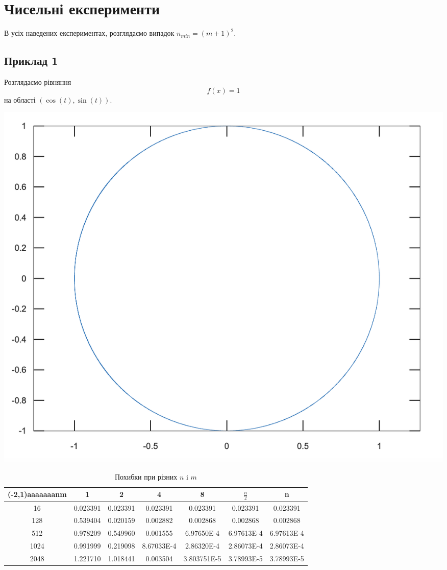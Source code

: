 \documentclass[12pt]{report}
\begin{document}
	\section{Чисельні експерименти}
	\hspace{0.8cm}В усіх наведених експериментах, розглядаємо випадок $n_{min}=(m+1)^2$.
	\subsection{Приклад 1}
	\hspace{0.8cm}Розглядаємо рівняння
	$$f(x)=1$$ 
	на області $(\cos(t), \sin(t))$.
	\begin{center}
	\includegraphics[scale=0.5]{2_3}
	\end{center}
	\begin{table}[ht]
		\centering 
		\begin{tabular}{c c c c c c c } %
			\hline\hline %
			
			\diaghead(-2,1){aaaaaaa}{n}{m} & 1 & 2 & 4 &8 & $\frac{n}{2}$ & n \\ [0.5ex] %
			\hline %
			16 & 0.023391& 0.023391 & 0.023391 & 0.023391&0.023391 &0.023391 \\ %
			128 & 0.539404& 0.020159 & 0.002882 &0.002868 &0.002868 &0.002868\\
			512 &0.978209 & 0.549960& 0.001555 &6.97650E-4 &6.97613E-4&6.97613E-4\\
			1024 & 0.991999 & 0.219098& 8.67033E-4&2.86320E-4 &2.86073E-4&2.86073E-4\\
			2048 & 1.221710& 1.018441& 0.003504&3.803751E-5&3.78993E-5&3.78993E-5
			\\ [1ex] %
			\hline %
		\end{tabular}
		\caption{Похибки при різних $n$ i $m$}
		\label{table:nonlin} %
	\end{table}
\end{document}
